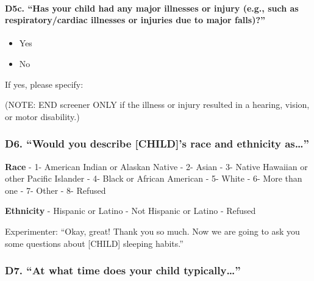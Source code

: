 \documentclass[
  12pt,
]{book}
\providecommand{\tightlist}{%
  \setlength{\itemsep}{0pt}\setlength{\parskip}{0pt}}
\begin{document}
\hypertarget{d5c.-has-your-child-had-any-major-illnesses-or-injury-e.g.-such-as-respiratorycardiac-illnesses-or-injuries-due-to-major-falls}{%
\paragraph*{D5c. ``Has your child had any major illnesses or injury (e.g., such as respiratory/cardiac illnesses or injuries due to major falls)?''}\label{d5c.-has-your-child-had-any-major-illnesses-or-injury-e.g.-such-as-respiratorycardiac-illnesses-or-injuries-due-to-major-falls}}

\begin{itemize}
\tightlist
\item
  Yes
\item
  No
\end{itemize}

If yes, please specify:

(NOTE: END screener ONLY if the illness or injury resulted in a hearing, vision, or motor disability.)

\hypertarget{d6.-would-you-describe-childs-race-and-ethnicity-as}{%
\subsubsection*{\texorpdfstring{D6. ``Would you describe {[}CHILD{]}'s race and ethnicity as\ldots{}''}{D6. ``Would you describe {[}CHILD{]}'s race and ethnicity as\ldots''}}\label{d6.-would-you-describe-childs-race-and-ethnicity-as}}

\textbf{Race}
- 1- American Indian or Alaskan Native
- 2- Asian
- 3- Native Hawaiian or other Pacific Islander
- 4- Black or African American
- 5- White
- 6- More than one
- 7- Other
- 8- Refused

\textbf{Ethnicity}
- Hispanic or Latino
- Not Hispanic or Latino
- Refused

Experimenter: ``Okay, great! Thank you so much. Now we are going to ask you some questions about {[}CHILD{]} sleeping habits.''

\hypertarget{d7.-at-what-time-does-your-child-typically}{%
\subsubsection*{\texorpdfstring{D7. ``At what time does your child typically\ldots{}''}{D7. ``At what time does your child typically\ldots''}}\label{d7.-at-what-time-does-your-child-typically}}
\end{document}
